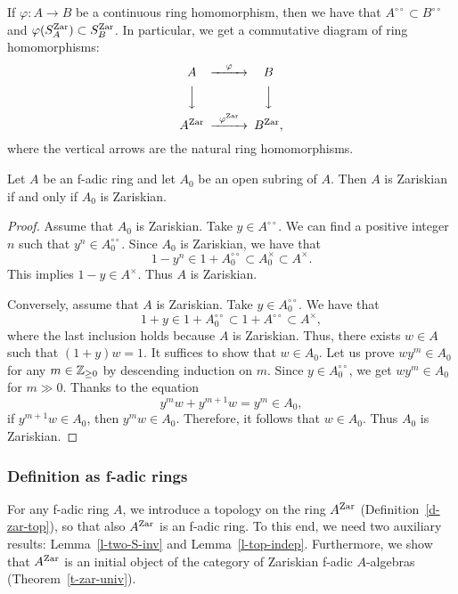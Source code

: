 \begin{rem}\label{r-zar2}
If $\varphi:A \to B$ be a continuous ring homomorphism, 
then we have that $A^{\circ\circ} \subset B^{\circ\circ}$ 
and $\varphi(S_A^{{\operatorname{Zar}}}) \subset S_B^{{\operatorname{Zar}}}$. 
In particular, we get a commutative diagram of ring homomorphisms:
$$\begin{CD}
A @>\varphi >> B\\
@VVV @VVV\\
A^{\Zar} @>\varphi^{\Zar}>> B^{\Zar}, 
\end{CD}$$ 
where the vertical arrows are the natural ring homomorphisms. 
\end{rem}


\begin{lem}\label{l-zar-sub}
Let $A$ be an f-adic ring and let $A_0$ be an open subring of $A$. 
Then $A$ is Zariskian if and only if $A_0$ is Zariskian. 
\end{lem}

\begin{proof}
Assume that $A_0$ is Zariskian. 
Take $y \in A^{\circ\circ}$. 
We can find a positive integer $n$ such that $y^n \in A_0^{\circ\circ}$. 
Since $A_0$ is Zariskian, we have that 
$$1-y^n \in 1+A_0^{\circ\circ} \subset A_0^{\times} \subset A^{\times}.$$
This implies $1-y \in A^{\times}$. 
Thus $A$ is Zariskian. 

Conversely, assume that $A$ is Zariskian. 
Take $y \in A_0^{\circ\circ}$. 
We have that 
$$1+y \in 1+A_0^{\circ\circ} \subset 1+A^{\circ\circ} \subset A^{\times},$$
where the last inclusion holds because $A$ is Zariskian. 
Thus, there exists $w \in A$ such that $(1+y)w=1$. 
It suffices to show that $w \in A_0$. 
Let us prove $wy^m \in A_0$ for any $m \in \mathbb{Z}_{\geq 0}$ 
by descending induction on $m$. 
Since $y \in A_0^{\circ\circ}$, we get $wy^m \in A_0$ for $m \gg 0$. 
Thanks to the equation 
$$y^mw+y^{m+1}w=y^m \in A_0,$$
if $y^{m+1}w \in A_0$, then $y^mw \in A_0$. 
Therefore, it follows that $w \in A_0$. 
Thus $A_0$ is Zariskian. 
\end{proof}



\subsubsection{Definition as f-adic rings}\label{sss-zar-def2}

For any f-adic ring $A$, 
we introduce a topology on the ring $A^{{\operatorname{Zar}}}$ (Definition~\ref{d-zar-top}), 
so that also $A^{{\operatorname{Zar}}}$ is an f-adic ring. 
To this end, we need two auxiliary results: Lemma~\ref{l-two-S-inv} 
and Lemma~\ref{l-top-indep}. 
Furthermore, we show that $A^{{\operatorname{Zar}}}$ is 
an initial object of the category of Zariskian f-adic $A$-algebras 
(Theorem~\ref{t-zar-univ}). 



